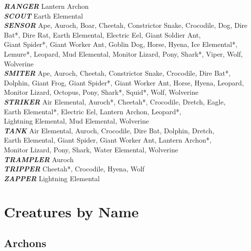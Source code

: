 \textbf{\textit{RANGER}} Lantern Archon \\

\textbf{\textit{SCOUT}} Earth Elemental \\

\textbf{\textit{SENSOR}} Ape, Auroch, Boar, Cheetah, Constrictor Snake, Crocodile, Dog, Dire Bat*, Dire Rat, Earth Elemental, Electric Eel, Giant Soldier Ant, \\ Giant Spider*, Giant Worker Ant, Goblin Dog, Horse, Hyena, Ice Elemental*, Lemure*, Leopard, Mud Elemental, Monitor Lizard, Pony, Shark*, Viper, Wolf, Wolverine \\

\textbf{\textit{SMITER}} Ape, Auroch, Cheetah, Constrictor Snake, Crocodile, Dire Bat*, Dolphin, Giant Frog, Giant Spider*, Giant Worker Ant, Horse, Hyena, Leopard, Monitor Lizard, Octopus, Pony, Shark*, Squid*, Wolf, Wolverine \\

\textbf{\textit{STRIKER}} Air Elemental, Auroch*, Cheetah*, Crocodile, Dretch, Eagle, \\ Earth Elemental*, Electric Eel, Lantern Archon, Leopard*, \\ Lightning Elemental, Mud Elemental, Wolverine \\

\textbf{\textit{TANK}} Air Elemental, Auroch, Crocodile, Dire Bat, Dolphin, Dretch, \\ Earth Elemental, Giant Spider, Giant Worker Ant, Lantern Archon*, \\ Monitor Lizard, Pony, Shark, Water Elemental, Wolverine \\

\textbf{\textit{TRAMPLER}} Auroch \\

\textbf{\textit{TRIPPER}} Cheetah*, Crocodile, Hyena, Wolf  \\

\textbf{\textit{ZAPPER}} Lightning Elemental \\

\newpage

\section{Creatures by Name} 

\subsection{Archons}

